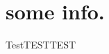 \begin{comment}
\documentclass[11pt]{article}  %
\usepackage{Common/toshi}

\end{comment}




\section{some info.}

TestTESTTEST





